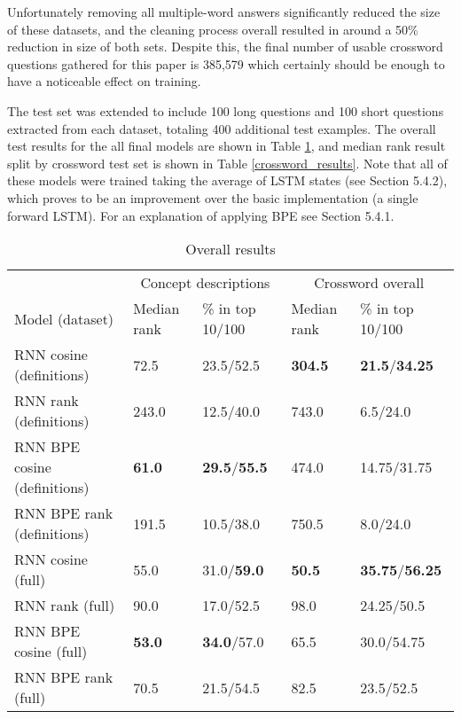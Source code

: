 \documentclass[11pt]{article}
\begin{document}
\begin{spacing}{1}
Unfortunately removing all multiple-word answers significantly reduced the size of these datasets, and the cleaning process overall resulted in around a 50\% reduction in size of both sets. Despite this, the final number of usable crossword questions gathered for this paper is 385,579 which certainly should be enough to have a noticeable effect on training.

The test set was extended to include 100 long questions and 100 short questions extracted from each dataset, totaling 400 additional test examples. The overall test results for the all final models are shown in Table \ref{overall_results}, and median rank result split by crossword test set is shown in Table \ref{crossword_results}. Note that all of these models were trained taking the average of LSTM states (see Section 5.4.2), which proves to be an improvement over the basic implementation (a single forward LSTM). For an explanation of applying BPE see Section 5.4.1.

\begin{table}[!htbp]
\caption{Overall results}
\begin{tabular}{l|ll|ll}
\toprule
                             & \multicolumn{2}{c|}{Concept descriptions}      & \multicolumn{2}{c}{Crossword overall}            \\
Model (dataset)              & Median rank   &\% in top 10/100    & Median rank    &\% in top 10/100     \\\midrule
RNN cosine (definitions)     & 72.5         & 23.5/52.5          & \textbf{304.5}          & \textbf{21.5}/\textbf{34.25}           \\
RNN rank (definitions)       & 243.0         & 12.5/40.0          & 743.0         & 6.5/24.0          \\
RNN BPE cosine (definitions) & \textbf{61.0} & \textbf{29.5}/\textbf{55.5} & 474.0 & 14.75/31.75 \\
RNN BPE rank (definitions)   & 191.5         & 10.5/38.0          & 750.5          & 8.0/24.0           \\\midrule
RNN cosine (full)            & 55.0          & 31.0/\textbf{59.0}         & \textbf{50.5}           & \textbf{35.75}/\textbf{56.25}           \\
RNN rank (full)              & 90.0         & 17.0/52.5         & 98.0           & 24.25/50.5         \\
RNN BPE cosine (full)        & \textbf{53.0}          & \textbf{34.0}/57.0          & 65.5           & 30.0/54.75         \\
RNN BPE rank (full)          & 70.5          & 21.5/54.5         & 82.5           & 23.5/52.5
\end{tabular}
\label{overall_results}
\end{table}


\end{spacing}
\end{document}
